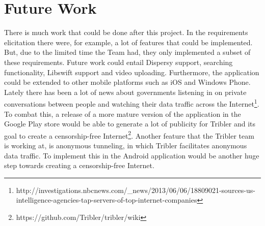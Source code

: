 \section{Future Work}
\thispagestyle{fancy}
There is much work that could be done after this project. In the requirements elicitation there were, for example, a lot of features that could be implemented. But, due to the limited time the Team had, they only implemented a subset of these requirements. Future work could entail Dispersy support, searching functionality, Libswift support and video uploading. Furthermore, the application could be extended to other mobile platforms such as iOS and Windows Phone. Lately there has been a lot of news about governments listening in on private conversations between people and watching their data traffic across the Internet\footnote{http://investigations.nbcnews.com/\_news/2013/06/06/18809021-sources-us-intelligence-agencies-tap-servers-of-top-internet-companies}. To combat this, a release of a more mature version of the application in the Google Play store would be able to generate a lot of publicity for Tribler and its goal to create a censorship-free Internet\footnote{https://github.com/Tribler/tribler/wiki}. Another feature that the Tribler team is working at, is anonymous tunneling, in which Tribler facilitates anonymous data traffic. To implement this in the Android application would be another huge step towards creating a censorship-free Internet.